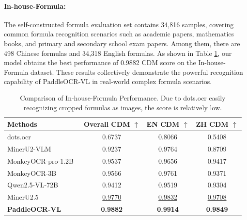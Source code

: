 \documentclass[11pt, a4paper,logo,  copyright, nonumbering]{paddleocr}
\begin{document}
\paragraph{In-house-Formula:} The self-constructed formula evaluation set contains 34,816 samples, covering common formula recognition scenarios such as academic papers, mathematics books, and primary and secondary school exam papers. Among them, there are 498 Chinese formulas and 34,318 English formulas. As shown in Table \ref{result_on_In-house_formula},  our model obtains the best performance of 0.9882 CDM score on the In-house-Formula dataset. These results collectively demonstrate the powerful recognition capability of PaddleOCR-VL in real-world complex formula scenarios.
 

\begin{table}[H] 
    \centering
\fontsize{7}{7}\selectfont

    \setlength{\tabcolsep}{6pt} %
      \renewcommand{\arraystretch}{1.2}
    \begin{tabular}{l|ccc}
\toprule[.9pt]
\textbf{Methods} & \textbf{Overall CDM $\uparrow$} & \textbf{EN CDM $\uparrow$} & \textbf{ZH CDM $\uparrow$} \\
\midrule
dots.ocr~\cite{dotsocr} &0.6737 &0.8066 &0.5408 \\

MinerU2-VLM~\cite{MinerU2} &0.9237 &0.9764 &0.8709 \\

MonkeyOCR-pro-1.2B~\cite{li2025monkeyocr} &0.9537 &0.9656 &0.9417 \\

MonkeyOCR-3B ~\cite{li2025monkeyocr} &0.9566 &0.9761 &0.9371 \\

Qwen2.5-VL-72B~\cite{bai2025qwen2} &0.9412 &0.9519 &0.9304 \\

MinerU2.5~\cite{niu2025mineru2} &\cellcolor{cyan!15}\underline{0.9770} &\cellcolor{cyan!15}\underline{0.9832} &\cellcolor{cyan!15}\underline{0.9708} \\

\textbf{PaddleOCR-VL} &\cellcolor{red!15}\textbf{0.9882} &\cellcolor{red!15}\textbf{0.9914}&\cellcolor{red!15}\textbf{0.9849} \\

\bottomrule
\end{tabular}
\caption{Comparison of In-house-Formula Performance. Due to dots.ocr \cite{dotsocr} easily recognizing cropped formulas as images, the score is relatively low.}
\label{result_on_In-house_formula}
\end{table}
\end{document}
